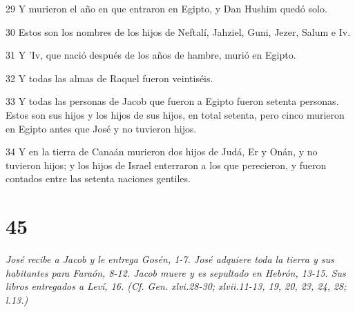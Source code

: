 \par 29 Y murieron el año en que entraron en Egipto, y Dan Hushim quedó solo.
\par 30 Estos son los nombres de los hijos de Neftalí, Jahziel, Guni, Jezer, Salum e Iv.
\par 31 Y 'Iv, que nació después de los años de hambre, murió en Egipto.
\par 32 Y todas las almas de Raquel fueron veintiséis.
\par 33 Y todas las personas de Jacob que fueron a Egipto fueron setenta personas. Estos son sus hijos y los hijos de sus hijos, en total setenta, pero cinco murieron en Egipto antes que José y no tuvieron hijos.
\par 34 Y en la tierra de Canaán murieron dos hijos de Judá, Er y Onán, y no tuvieron hijos; y los hijos de Israel enterraron a los que perecieron, y fueron contados entre las setenta naciones gentiles.

\chapter{45}

\par \textit{José recibe a Jacob y le entrega Gosén, 1-7. José adquiere toda la tierra y sus habitantes para Faraón, 8-12. Jacob muere y es sepultado en Hebrón, 13-15. Sus libros entregados a Leví, 16. (Cf. Gen. xlvi.28-30; xlvii.11-13, 19, 20, 23, 24, 28; l.13.)}

